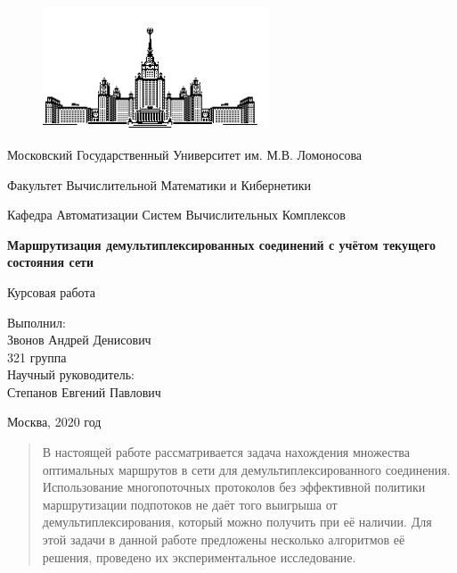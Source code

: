 \documentclass[a4paper]{article}
\begin{document}
\begin{titlepage}
\thispagestyle{empty}

\begin{center}
\begin{figure}[htbp]
  \centering
  \includegraphics[width=0.6\textwidth]{msu}
\end{figure}


Московский Государственный Университет им. М.В. Ломоносова

Факультет Вычислительной Математики и Кибернетики

Кафедра Автоматизации Систем Вычислительных Комплексов

\vfill
\textbf{\Huge Маршрутизация демультиплексированных соединений с учётом текущего состояния сети}

\vfill
{\huge Курсовая работа}
\end{center}

\vfill
\begin{flushright}
{\large Выполнил:\\Звонов Андрей Денисович\\321 группа\\}
\vspace{0.5cm}
{\large Научный руководитель:\\Степанов Евгений Павлович}
\end{flushright}

\vfill
\centerline{Москва, 2020 год}

\end{titlepage}
\linespread{1.5}
\setcounter{page}{2}
\large

\begin{abstract}
\large
В настоящей работе рассматривается задача нахождения множества оптимальных маршрутов в сети для демультиплексированного соединения. Использование многопоточных протоколов без эффективной политики маршрутизации подпотоков не даёт того выигрыша от демультиплексирования, который можно получить при её наличии.
Для этой задачи в данной работе предложены несколько алгоритмов её решения, проведено их экспериментальное исследование.

\end{abstract}
\newpage
\end{document}
